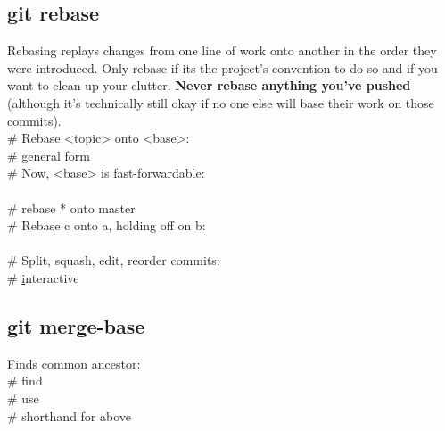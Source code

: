\subsection*{git rebase}
{\footnotesize 
Rebasing replays changes from one line of work onto another in the order they were introduced.  
Only rebase if it\textquotesingle s the project's convention to do so and if you want to clean up your clutter. \textbf{Never rebase anything you've pushed} (although it's technically still okay if no one else will base their work on those commits).}\\
\# Rebase <topic> onto <base>:\\ 
 \# general form \\
\# Now, <base> is fast-forwardable:\\
\\
 \# rebase * onto master\\
\# Rebase c onto a, holding off on b: \\
 \\
\# Split, squash, edit, reorder commits: \\
 \# \underline{i}nteractive


\subsection*{git merge-base}
Finds common ancestor:\\
 \# find \\
 \# use \\
 \# shorthand for above 

